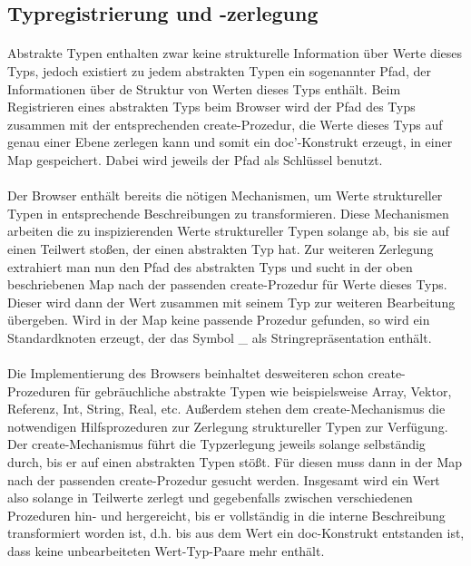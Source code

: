 \documentclass[12pt,a4paper]{article}
\begin{document}
\subsection{Typregistrierung und -zerlegung}

\paragraph{}

Abstrakte Typen enthalten zwar keine strukturelle Information \"uber 
Werte dieses Typs, jedoch existiert zu jedem abstrakten Typen ein sogenannter 
Pfad, der Informationen \"uber de Struktur von Werten dieses Typs enth\"alt.
Beim Registrieren eines abstrakten Typs beim Browser wird der Pfad des Typs 
zusammen mit der entsprechenden create-Prozedur, die Werte dieses Typs auf 
genau einer Ebene zerlegen kann und somit ein doc'-Konstrukt erzeugt, in einer 
Map gespeichert. Dabei wird jeweils der Pfad als Schl\"ussel benutzt.

\paragraph{} 

Der Browser enth\"alt bereits die n\"otigen Mechanismen, 
um Werte struktureller 
Typen in entsprechende Beschreibungen zu transformieren. 
Diese Mechanismen arbeiten die zu inspizierenden Werte 
struktureller Typen solange ab, bis sie auf einen Teilwert sto\ss en, der
einen abstrakten Typ hat. Zur weiteren Zerlegung extrahiert man nun den Pfad
des abstrakten Typs und sucht in der oben beschriebenen Map nach der passenden
create-Prozedur f\"ur Werte dieses Typs.  
Dieser wird dann der Wert zusammen mit seinem Typ zur weiteren Bearbeitung 
\"ubergeben.  Wird in der Map keine passende Prozedur gefunden, 
so wird ein Standardknoten erzeugt, der das Symbol \_ als 
Stringrepr\"asentation enth\"alt.

\paragraph{} 

Die Implementierung des Browsers beinhaltet desweiteren schon create- \newline
Prozeduren f\"ur gebr\"auchliche abstrakte Typen wie beispielsweise 
Array, Vektor, Referenz, Int, String, Real, etc.
Au\ss erdem stehen dem create-Mechanismus die notwendigen Hilfsprozeduren
zur Zerlegung struktureller Typen zur Verf\"ugung. Der create-Mechanismus 
f\"uhrt die Typzerlegung jeweils solange selbst\"andig durch, bis er auf einen 
abstrakten Typen st\"o\ss t. F\"ur diesen muss dann in der Map nach der
 passenden create-Prozedur gesucht werden. 
Insgesamt wird ein Wert also solange in Teilwerte zerlegt und gegebenfalls
zwischen verschiedenen Prozeduren hin- und hergereicht, bis er vollst\"andig
in die interne Beschreibung transformiert worden ist, d.h. bis aus dem
Wert ein doc-Konstrukt entstanden ist, dass keine unbearbeiteten 
Wert-Typ-Paare mehr enth\"alt.
\end{document}
